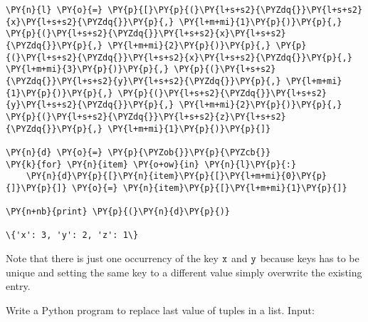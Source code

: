 \begin{Answer}
\begin{tcolorbox}[size=fbox, boxrule=1pt, colback=cellbackground, colframe=cellborder]
\begin{Verbatim}[commandchars=\\\{\}]
\PY{n}{l} \PY{o}{=} \PY{p}{[}\PY{p}{(}\PY{l+s+s2}{\PYZdq{}}\PY{l+s+s2}{x}\PY{l+s+s2}{\PYZdq{}}\PY{p}{,} \PY{l+m+mi}{1}\PY{p}{)}\PY{p}{,} \PY{p}{(}\PY{l+s+s2}{\PYZdq{}}\PY{l+s+s2}{x}\PY{l+s+s2}{\PYZdq{}}\PY{p}{,} \PY{l+m+mi}{2}\PY{p}{)}\PY{p}{,} \PY{p}{(}\PY{l+s+s2}{\PYZdq{}}\PY{l+s+s2}{x}\PY{l+s+s2}{\PYZdq{}}\PY{p}{,} \PY{l+m+mi}{3}\PY{p}{)}\PY{p}{,} \PY{p}{(}\PY{l+s+s2}{\PYZdq{}}\PY{l+s+s2}{y}\PY{l+s+s2}{\PYZdq{}}\PY{p}{,} \PY{l+m+mi}{1}\PY{p}{)}\PY{p}{,} \PY{p}{(}\PY{l+s+s2}{\PYZdq{}}\PY{l+s+s2}{y}\PY{l+s+s2}{\PYZdq{}}\PY{p}{,} \PY{l+m+mi}{2}\PY{p}{)}\PY{p}{,} \PY{p}{(}\PY{l+s+s2}{\PYZdq{}}\PY{l+s+s2}{z}\PY{l+s+s2}{\PYZdq{}}\PY{p}{,} \PY{l+m+mi}{1}\PY{p}{)}\PY{p}{]}

\PY{n}{d} \PY{o}{=} \PY{p}{\PYZob{}}\PY{p}{\PYZcb{}}
\PY{k}{for} \PY{n}{item} \PY{o+ow}{in} \PY{n}{l}\PY{p}{:}
    \PY{n}{d}\PY{p}{[}\PY{n}{item}\PY{p}{[}\PY{l+m+mi}{0}\PY{p}{]}\PY{p}{]} \PY{o}{=} \PY{n}{item}\PY{p}{[}\PY{l+m+mi}{1}\PY{p}{]}
    
\PY{n+nb}{print} \PY{p}{(}\PY{n}{d}\PY{p}{)}

\{'x': 3, 'y': 2, 'z': 1\}
\end{Verbatim}
\end{tcolorbox}

Note that there is just one occurrency of the key $\tt{x}$ and $\tt{y}$ because keys has to be unique and setting the same key to a different value simply overwrite the existing entry.
\end{Answer}

\begin{Exercise}
Write a Python program to replace last value of tuples in a list.
Input:
\begin{Shaded}
\begin{Highlighting}[]
\OperatorTok{=}\NormalTok{ [(}\NormalTok{, }\NormalTok{, }\NormalTok{), (}\NormalTok{, }\NormalTok{, }\NormalTok{), (}\NormalTok{, }\NormalTok{, }\NormalTok{)]}
\end{Highlighting}
\end{Shaded}
\end{Exercise}

